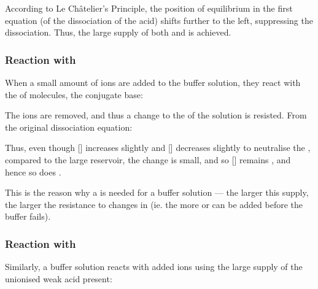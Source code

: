 
				According to Le Châtelier's Principle, the position of equilibrium in the first equation (of the dissociation of the acid)
				shifts further to the left, suppressing the dissociation. Thus, the large supply of both  and  is
				achieved.



			\subsubsection{Reaction with \texorpdfstring{}{H⁺}}

				When a small amount of  ions are added to the buffer solution, they react with the  of
				 molecules, the conjugate base:


				The  ions are removed, and thus a change to the \pH{} of the solution is resisted. From the original dissociation
				equation:

				\diagram[1.5]{
					$[H^{+}] = \MKa \times \frac{[CH_{3}CO_{2}H]}{[CH_{3}CO_{2}^{-}]}$
				}{}

				Thus, even though [] increases slightly and [] decreases slightly to neutralise the , compared
				to the large reservoir, the change is small, and so [] remains , and hence so does \pH{}.

				This is the reason why a  is needed for a buffer solution --- the larger this supply, the larger the
				resistance to changes in \pH{} (ie. the more  or  can be added before the buffer fails).



			\pagebreak
			\subsubsection{Reaction with \texorpdfstring{}{OH⁻}}

				Similarly, a buffer solution reacts with added  ions using the large supply of the unionised weak acid present:


